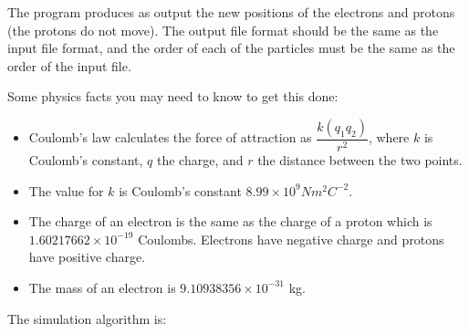 \documentclass[letterpaper,10pt]{article}
\begin{document}
The program produces as output the new positions of the electrons and protons (the protons do not move). The output file format should be the same as the input file format, and the order of each of the particles must be the same as the order of the input file.

Some physics facts you may need to know to get this done:

\begin{itemize}
\item Coulomb's law calculates the force of attraction as $\dfrac{k (q_{1} q_{2})}{r^{2}}$, where $k$ is Coulomb's constant, $q$ the charge, and $r$ the distance between the two points.

\item The value for $k$ is Coulomb's constant $8.99 \times 10^{9} N m^{2} C^{-2}$. 

\item The charge of an electron is the same as the charge of a proton which is $1.60217662 \times 10^{-19}$ Coulombs. Electrons have negative charge and protons have positive charge. 

\item The mass of an electron is $9.10938356 \times 10^{-31}$ kg.
\end{itemize}


The simulation algorithm is:
\end{document}
